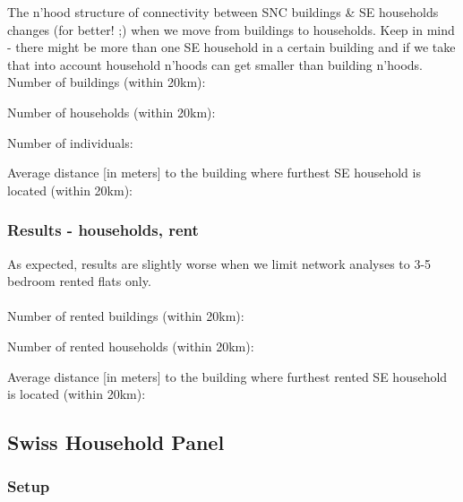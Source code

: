 \documentclass[a4paper, notitlepage, fleqn]{article} %
\begin{document}
The n'hood structure of connectivity between SNC buildings \& SE households changes (for better! ;)
when we move from buildings to households. 
Keep in mind - there might be more than one SE household in a certain building and if we take that into account 
household n'hoods can get smaller than building n'hoods. 
Number of buildings (within 20km):
\begin{stlog}\end{stlog}
Number of households (within 20km):
\begin{stlog}\end{stlog}
Number of individuals:
\begin{stlog}\end{stlog}
Average distance [in meters] to the building where furthest SE household is located (within 20km):
\begin{stlog}\end{stlog}
\subsubsection{Results - households, rent}

As expected, results are slightly worse when we limit network analyses to 3-5 bedroom rented flats only. \\
\\
Number of rented buildings (within 20km):
\begin{stlog}\end{stlog}
Number of rented households (within 20km):
\begin{stlog}\end{stlog}
Average distance [in meters] to the building where furthest rented SE household is located (within 20km):
\begin{stlog}\end{stlog}
\newpage
\subsection{Swiss Household Panel}

\subsubsection{Setup}
\end{document}
